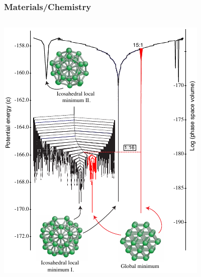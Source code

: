 \documentclass[aspectratio=169]{beamer}
\begin{document}
\begin{frame}
    \frametitle{Materials/Chemistry}
    \begin{columns}
        
        \includegraphics[width=\textwidth]{figures/materials}
        
    \end{columns}
\end{frame}
\end{document}

